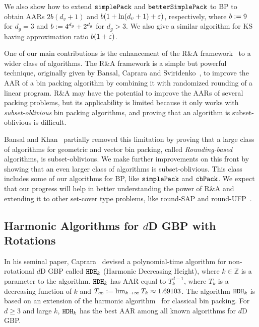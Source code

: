 We also show how to extend $\operatorname{\mathtt{simplePack}}$ and $\operatorname{\mathtt{betterSimplePack}}$ to  BP
to obtain AARs $2b(d_v+1)$ and $b(1 + \ln(d_v + 1) + \varepsilon)$, respectively,
where $b := 9$ for $d_g = 3$ and $b := 4^{d_g} + 2^{d_g}$ for $d_g > 3$.
We also give a similar algorithm for  KS
having approximation ratio $b(1+\varepsilon)$.

One of our main contributions is the enhancement of
the R\&A framework~\cite{rna,bansal2014binpacking} to a wider class of algorithms.
The R\&A framework is a simple but powerful technique,
originally given by Bansal, Caprara and Sviridenko~\cite{rna},
to improve the AAR of a bin packing algorithm by combining it with
randomized rounding of a linear program.
R\&A may have the potential to improve the AARs of several packing problems,
but its applicability is limited because
it only works with \emph{subset-oblivious} bin packing algorithms,
and proving that an algorithm is subset-oblivious is difficult.

Bansal and Khan~\cite{bansal2014binpacking} partially removed this limitation
by proving that a large class of algorithms for geometric and vector bin packing,
called \emph{Rounding-based} algorithms, is subset-oblivious.
We make further improvements on this front by showing that an even larger class
of algorithms is subset-oblivious.
This class includes some of our algorithms for  BP,
like $\operatorname{\mathtt{simplePack}}$ and $\operatorname{\mathtt{cbPack}}$.
We expect that our progress will help in better understanding the power of R\&A
and extending it to other set-cover type problems,
like round-SAP and round-UFP~\cite{ElbassioniGGKNP12}.

\subsection{Harmonic Algorithms for \texorpdfstring{$d$}{d}D GBP with Rotations}
\label{sec:intro:hdhk}

In his seminal paper, Caprara~\cite{caprara2008} devised a polynomial-time algorithm
for non-rotational $d$D GBP called $\operatorname{\mathtt{HDH}}_{k}$ (Harmonic Decreasing Height),
where $k \in \mathbb{Z}$ is a parameter to the algorithm.
$\operatorname{\mathtt{HDH}}_{k}$ has AAR equal to $T_k^{d-1}$,
where $T_k$ is a decreasing function of $k$ and
$T_{\infty} := \lim_{k \to \infty} T_k \approx 1.69103$.
The algorithm $\operatorname{\mathtt{HDH}}_{k}$ is based on an extension of the harmonic algorithm~\cite{leelee}
for classical bin packing.
For $d \ge 3$ and large $k$, $\operatorname{\mathtt{HDH}}_{k}$ has the best AAR
among all known algorithms for $d$D GBP.

